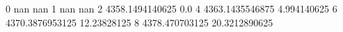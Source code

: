 0 nan nan
1 nan nan
2 4358.1494140625 0.0
4 4363.1435546875 4.994140625
6 4370.3876953125 12.23828125
8 4378.470703125 20.3212890625
